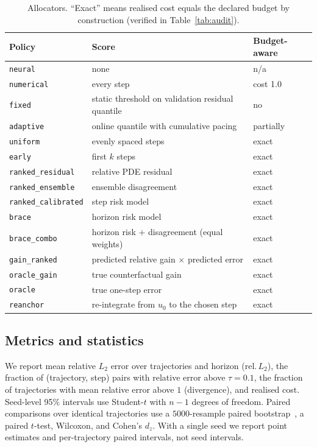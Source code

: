 \documentclass[11pt]{article}
\newcommand{\relL}{rel.\,$L_2$}
\begin{document}
\begin{table}[t]
\centering
\small
\begin{tabular}{lll}
\toprule
Policy & Score & Budget-aware \\
\midrule
\texttt{neural} & none & n/a \\
\texttt{numerical} & every step & cost 1.0 \\
\texttt{fixed} & static threshold on validation residual quantile & no \\
\texttt{adaptive} & online quantile with cumulative pacing & partially \\
\texttt{uniform} & evenly spaced steps & exact \\
\texttt{early} & first $k$ steps & exact \\
\texttt{ranked\_residual} & relative PDE residual & exact \\
\texttt{ranked\_ensemble} & ensemble disagreement & exact \\
\texttt{ranked\_calibrated} & step risk model & exact \\
\texttt{brace} & horizon risk model & exact \\
\texttt{brace\_combo} & horizon risk $+$ disagreement (equal weights) & exact \\
\texttt{gain\_ranked} & predicted relative gain $\times$ predicted error & exact \\
\texttt{oracle\_gain} & true counterfactual gain & exact \\
\texttt{oracle} & true one-step error & exact \\
\texttt{reanchor} & re-integrate from $u_0$ to the chosen step & exact \\
\bottomrule
\end{tabular}
\caption{Allocators. ``Exact'' means realised cost equals the declared budget
by construction (verified in Table~\ref{tab:audit}).}
\label{tab:policies}
\end{table}

\subsection{Metrics and statistics}
We report mean relative $L_2$ error over trajectories and horizon
(\relL), the fraction of (trajectory, step) pairs with relative error above
$\tau=0.1$, the fraction of trajectories with mean relative error above $1$
(divergence), and realised cost. Seed-level 95\% intervals use Student-$t$ with
$n-1$ degrees of freedom. Paired comparisons over identical trajectories use a
$5000$-resample paired bootstrap~\cite{efron1993bootstrap}, a paired $t$-test, Wilcoxon, and Cohen's
$d_z$. With a single seed we report point estimates and per-trajectory paired
intervals, not seed intervals.
\end{document}
